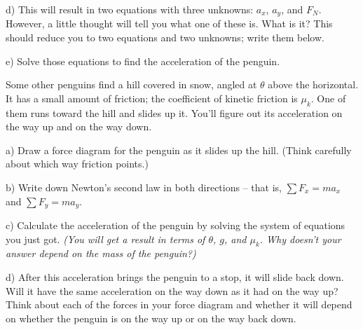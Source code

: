 \documentclass[12pt]{article}
\begin{document}
		\vspace{3in}
		\newpage
		
		d) This will result in two equations with three unknowns: $a_x$, $a_y$, and $F_N$. However, a little thought will
		tell you what one of these is. What is it? This should reduce you to two equations and two unknowns; write them below.
		
		\vspace{2in}
		
		e) Solve those equations to find the acceleration of the penguin.
		
%		
%		
		\newpage
		
	    Some other penguins find a hill covered in snow, angled at $\theta$ above the horizontal. It has a small amount of friction; the coefficient of kinetic friction is $\mu_k$. One of them runs toward the hill and slides up it. You'll figure out its acceleration on the way up and on the way down.
	    
	    a) Draw a force diagram for the penguin as it slides up the hill. (Think carefully about which way friction points.)
	    
	    \vspace{3in}
	    
	    b) Write down Newton's second law in both directions -- that is, $\sum F_x = ma_x$ and $\sum F_y = ma_y$.
	    
	    \vspace{2in}
	    
	    \newpage
	    
	    c) Calculate the acceleration of the penguin by solving the system of equations you just got. {\it (You will get a result in terms of $\theta$, $g$, and $\mu_k$. Why doesn't your answer depend on the mass of the penguin?)}
	    
	    \vspace{2in}
		
		d) After this acceleration brings the penguin to a stop, it will slide back down. Will it have the same acceleration on the way down as it had on the way up? Think about each of the forces in your force diagram and whether it will depend on whether the penguin is on the way up or on the way back down.
		
\end{document}
